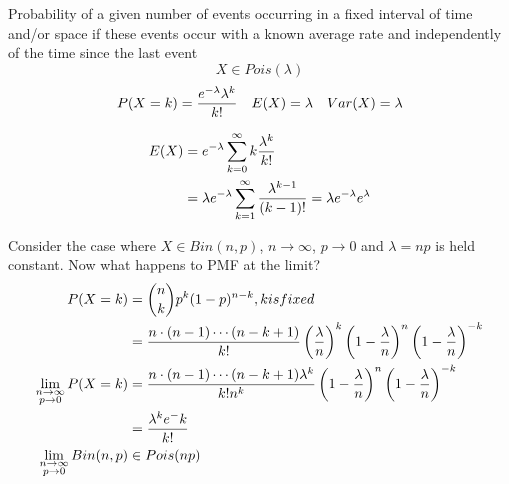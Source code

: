 \begin{slide} 
  \begin{shaded}
{\noindent
Probability of a given number of events occurring in a fixed interval of time and/or space if these events occur with a known average rate and independently of the time since the last event
}
    $$X \in Pois(\lambda)$$
    $$
    P(X=k) = {e^{-\lambda} \lambda^k \over k!} 
    \quad 
    E(X)= \lambda
    \quad
    Var(X)= \lambda
    $$
  \end{shaded}
\begin{align*}
E(X) &= e^{-\lambda}\sum_{k=0}^{\infty}k {\lambda^k \over k!}
\\
 &=\lambda e^{-\lambda}\sum_{k=1}^{\infty}{\lambda^{k-1} \over (k-1)!}
 = \lambda e^{-\lambda} e^\lambda
\end{align*}
\end{slide}

\begin{slide}
Consider the case where $X\in Bin(n,p)$, $n\to \infty$, $p\to 0$ and $\lambda = np$ is held constant. Now what happens to PMF at the limit?
\begin{align*}
P(X=k) &= {n \choose k}p^k(1-p)^{n-k}, k is fixed\\
 &= {n\cdot{}(n-1)\cdots{}(n-k+1) \over k!}   \left({\lambda \over n}\right)^k\left(1-{\lambda \over n}\right)^n\left(1-{\lambda \over n}\right)^{-k}\\
\lim_{\substack{n\to\infty\\ p\to 0}} P(X=k) &= {n\cdot{}(n-1)\cdots{}(n-k+1)\lambda^k \over k!n^k}\left(1-{\lambda \over n}\right)^n\left(1-{\lambda \over n}\right)^{-k}\\
&={\lambda^ke^-k \over k!}\\
\lim_{\substack{n\to\infty\\ p\to 0}} Bin(n,p)&\in Pois(np) 
\end{align*}
\end{slide}
